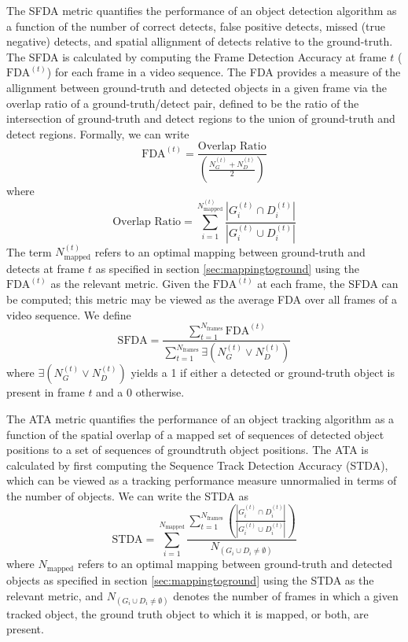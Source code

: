 \documentclass[smallcondensed, final]{svjour3}
\begin{document}
The SFDA metric quantifies the performance of an object detection algorithm as a function of the number of correct detects, false positive detects, missed (true negative) detects, and spatial allignment of detects relative to the ground-truth. The SFDA is calculated by computing the Frame Detection Accuracy at frame $t$ ($\text{FDA}^{(t)}$) for each frame in a video sequence. The FDA provides a measure of the allignment between ground-truth and detected objects in a given frame via the overlap ratio of a ground-truth/detect pair, defined to be the ratio of the intersection of ground-truth and detect regions to the union of ground-truth and detect regions. Formally, we can write
\begin{equation}
\text{FDA}^{(t)} = \frac{\text{Overlap Ratio}}{\left(\frac{N_{G}^{(t)} + N_{D}^{(t)}}{2}\right)}
\end{equation}
where
\begin{equation}
\text{Overlap Ratio} = \sum_{i = 1}^{N_{\text{mapped}}^{(t)}} \frac{\left|G_{i}^{(t)} \cap D_{i}^{(t)}\right|}{\left|G_{i}^{(t)} \cup D_{i}^{(t)}\right|}
\end{equation}
The term $N_{\text{mapped}}^{(t)}$ refers to an optimal mapping between ground-truth and detects at frame $t$ as specified in section \ref{sec:mappingtoground} using the $\text{FDA}^{(t)}$ as the relevant metric. Given the $\text{FDA}^{(t)}$ at each frame, the SFDA can be computed; this metric may be viewed as the average FDA over all frames of a video sequence. We define
\begin{equation}
\text{SFDA} = \frac{\sum_{t=1}^{N_{\text{frames}}} \text{FDA}^{(t)}}{\sum_{t=1}^{N_{\text{frames}}} \exists \left( N_{G}^{(t)} \vee N_{D}^{(t)} \right)}
\end{equation}
where $\exists \left( N_{G}^{(t)} \vee N_{D}^{(t)} \right)$ yields a 1 if either a detected or ground-truth object is present in frame $t$ and a 0 otherwise.

The ATA metric quantifies the performance of an object tracking algorithm as a function of the spatial overlap of a mapped set of sequences of detected object positions to a set of sequences of groundtruth object positions. The ATA is calculated by first computing the Sequence Track Detection Accuracy (STDA), which can be viewed as a tracking performance measure unnormalied in terms of the number of objects. We can write the STDA as
\begin{equation}
\text{STDA} = \sum_{i=1}^{N_{\text{mapped}}} \frac{\sum_{t=1}^{N_{\text{frames}}} \left( \frac{\left|G_{i}^{(t)} \cap D_{i}^{(t)}\right|}{\left|G_{i}^{(t)} \cup D_{i}^{(t)}\right|}  \right) }{ N_{(G_{i} \cup D_{i} \neq \emptyset)} }
\end{equation}
where $N_{\text{mapped}}$ refers to an optimal mapping between ground-truth and detected objects as specified in section \ref{sec:mappingtoground} using the STDA as the relevant metric, and $N_{(G_{i} \cup D_{i} \neq \emptyset)}$ denotes the number of frames in which a given tracked object, the ground truth object to which it is mapped, or both, are present.
\end{document}
